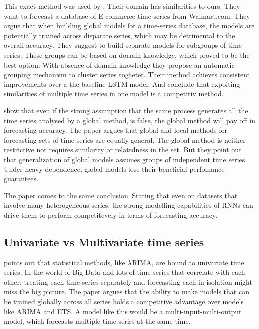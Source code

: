 This exact method was used by \cite{Bandara2017}.
Their domain has similarities to ours. They want to forecast a database of E-commerce time series
from Walmart.com.
They argue that when building global models for a time-series database, the models are 
potentially trained across disparate series, which may be detrimental to the overall accuracy.
They suggest to build separate models for subgroups of time series.
These groups can be based on domain knowledge, which proved to be the best option. With absence of 
domain knowledge they propose an automatic grouping mechanism to cluster series togheter.
Their method achieves consistent improvements over a the baseline LSTM model.
And conclude that expoiting similarities of multiple time series in one model is a competitiv method.




\cite{Rabanser2020} show that even if the strong assumption that the same process generates all the time series analysed by a global
method, is false, the global method will pay off in forecasting accuracy.
The paper argues that global and local methods for forecasting
sets of time series are equally general. The global method is neither restrictive nor requires
similarity or relatedness in the set.
But they point out that generalization of global models assumes groups of independent time series.
Under heavy dependence, global models lose their beneficial perfomance guarantees. 

The paper \cite{Hewamalage2021} comes to the same conclusion. Stating that 
even on datasets that involve many heterogeneous series, the strong modelling capabilities of RNNs can drive
them to perform competitevely in terms of forecasting accuracy.

\subsection{Univariate vs Multivariate time series}
\cite{Bandara2017} points out that statistical methods, like ARIMA, are bound to
univariate time series. In the world of Big Data and lots of time series that correlate with each other,
treating each time series separately and forecasting each in isolation might miss the big picture.
The paper argues that the ability to make models that can be trained globally across all series
holds a competitive advantage over models like ARIMA and ETS.
A model like this would be a multi-input-multi-output model, which forecasts multiple time series
at the same time.

